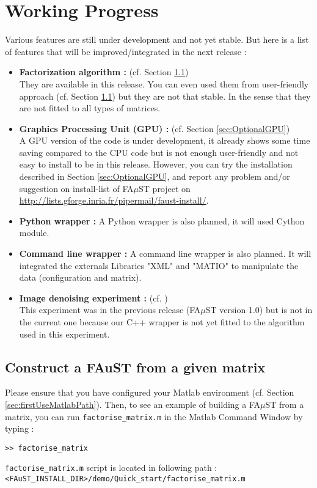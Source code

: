 \chapter{Working Progress}\label{sec:WorkingProgress}
	Various features are still under development and not yet stable.
But here is a list of features that will be improved/integrated in the next release :
\begin{itemize}
	\item \textbf{Factorization algorithm :} (cf. Section \ref{sec:WorkingProgressBuildFromMatrix})\\ 
They are available in this release. You can even used them
from user-friendly approach (cf. Section \ref{sec:WorkingProgressBuildFromMatrix}) but they are not
that stable. In the sense that they are not fitted to all types of matrices.
	\item \textbf{Graphics Processing Unit (GPU) :} (cf. Section \ref{sec:OptionalGPU})\\
A GPU version of the code is under development, it already shows 
some time saving compared to the CPU code but is not enough user-friendly and not easy to install to be in this release. However, you can try the installation described in Section \ref{sec:OptionalGPU}, and report any problem and/or suggestion on install-list of FA$\mu$ST project on \url{http://lists.gforge.inria.fr/pipermail/faust-install/}. 
	\item \textbf{Python wrapper :} A Python wrapper is also planned, it will used Cython module.
	\item \textbf{Command line wrapper :} A command line wrapper is also planned. It will integrated the externals Libraries "XML" and "MATIO" to manipulate the data (configuration and matrix). 
	\item \textbf{Image denoising experiment :} (cf. \cite[chapter VI.]{LeMagoarou2016}) \\
This experiment was in the previous release (FA$\mu$ST version 1.0) but is not in the current one because our C++ wrapper is not yet fitted to the algorithm used in this experiment.    
\end{itemize}

\section{Construct a FAuST from a given matrix}\label{sec:WorkingProgressBuildFromMatrix}
Please ensure that you have configured your Matlab environment (cf. Section \ref{sec:firstUseMatlabPath}). Then, to see an example of building a FA$\mu$ST from a matrix, you can run \texttt{factorise\_matrix.m} in the Matlab Command Window by typing :
\lstset{style=customMatlab}
\begin{lstlisting}
>> factorise_matrix
\end{lstlisting}
\texttt{factorise\_matrix.m} script is located in following path :\\
\texttt{<FAuST\_INSTALL\_DIR>/demo/Quick\_start/factorise\_matrix.m} \\

